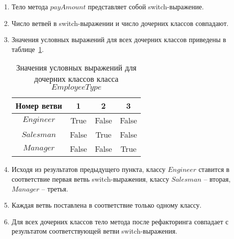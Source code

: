 \begin{enumerate}
    \item Тело метода $payAmount$ представляет собой switch-выражение.
    \item Число ветвей в switch-выражении и число дочерних классов совпадают.
    \item Значения условных выражений для всех дочерних классов приведены в таблице~\ref{et-c}.
    \begin{table}[H]
    \begin{center}
    \begin{tabular}{|c|c|c|c|}
    \hline
    Номер ветви & 1 & 2 & 3\\
    \hline
    $Engineer$ & True & False & False\\
    \hline
    $Salesman$ & False & True & False\\
    \hline
    $Manager$ & False & False & True\\
    \hline
    \end{tabular}
    \end{center}
    \caption{Значения условных выражений для дочерних классов класса $EmployeeType$}
    \label{et-c}
    \end{table}
    \item Исходя из результатов предыдущего пункта, классу $Engineer$ ставится в соответствие первая ветвь switch-выражения, классу $Salesman$ -- вторая, $Manager$ -- третья.
    \item Каждая ветвь поставлена в соответствие только одному классу.
    \item Для всех дочерних классов тело метода после рефакторинга совпадает с результатом соответствующей ветви switch-выражения.
\end{enumerate}